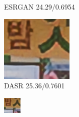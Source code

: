 \begin{figure}[htbp]
\begin{subfigure}{0.3\textwidth}
        \caption{ESRGAN 24.29/0.6954} 
    \end{subfigure}
    \hfill
    \begin{subfigure}{0.3\textwidth}
        \includegraphics[width=\linewidth]{imgs/DASR_25.36_0.7601_Canon_033.png}
        \caption{DASR 25.36/0.7601} 
    \end{subfigure}
    \begin{subfigure}{0.3\textwidth}
        \includegraphics[width=\linewidth]{imgs/LR_Canon_033.png}

\end{subfigure}
\end{figure}

